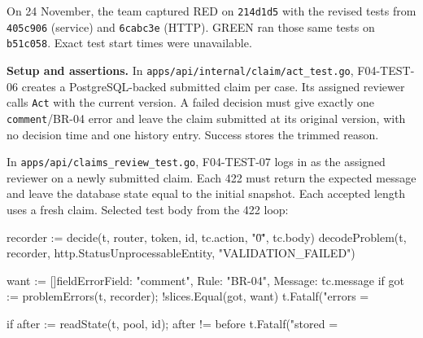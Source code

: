 \label{ev:redgreen}
On 24 November, the team captured RED on \texttt{214d1d5} with the revised tests from \texttt{405c906} (service) and \texttt{6cabc3e} (HTTP). GREEN ran those same tests on \texttt{b51c058}. Exact test start times were unavailable.

\textbf{Setup and assertions.}
In \texttt{apps/api/internal/claim/act\_test.go}, F04-TEST-06 creates a PostgreSQL-backed submitted claim per case. Its assigned reviewer calls \texttt{Act} with the current version. A failed decision must give exactly one \texttt{comment}/BR-04 error and leave the claim submitted at its original version, with no decision time and one history entry. Success stores the trimmed reason.

In \texttt{apps/api/claims\_review\_test.go}, F04-TEST-07 logs in as the assigned reviewer on a newly submitted claim. Each 422 must return the expected message and leave the database state equal to the initial snapshot. Each accepted length uses a fresh claim. Selected test body from the 422 loop:
\begin{record}
recorder := decide(t, router, token, id, tc.action, "\"0\"", tc.body)
decodeProblem(t, recorder, http.StatusUnprocessableEntity, "VALIDATION_FAILED")

want := []fieldError{{Field: "comment", Rule: "BR-04", Message: tc.message}}
if got := problemErrors(t, recorder); !slices.Equal(got, want) {
    t.Fatalf("errors = %
}

if after := readState(t, pool, id); after != before {
    t.Fatalf("stored = %
}
\end{record}

